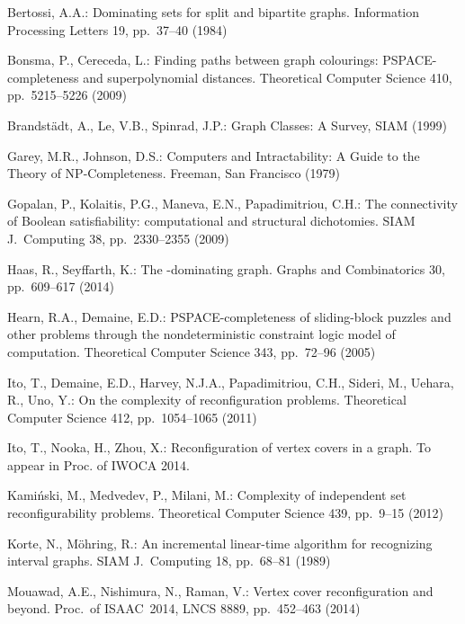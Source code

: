 \documentclass{llncs}
\begin{document}

\begin{thebibliography}{99}

Bertossi, A.A.:
Dominating sets for split and bipartite graphs.
Information Processing Letters 19, pp.~37--40 (1984)



Bonsma, P., Cereceda, L.:
Finding paths between graph colourings: PSPACE-completeness and superpolynomial distances.
Theoretical Computer Science
410, pp.~5215--5226 (2009)


Brandst\"adt, A., Le, V.B., Spinrad, J.P.:
Graph Classes: A Survey, SIAM (1999)




Garey, M.R., Johnson, D.S.:
Computers and Intractability: A Guide to the Theory of {NP}-Completeness.
Freeman, San Francisco (1979)



Gopalan, P., Kolaitis, P.G., Maneva, E.N., Papadimitriou, C.H.:
The connectivity of Boolean satisfiability: computational and structural dichotomies.
SIAM J.~Computing 38, pp.~2330--2355 (2009)

Haas, R., Seyffarth, K.:
The -dominating graph.
Graphs and Combinatorics 30, pp.~609--617 (2014)

Hearn, R.A., Demaine, E.D.:
PSPACE-completeness of sliding-block puzzles and other problems through the nondeterministic constraint logic model of computation.
Theoretical Computer Science
343, pp.~72--96 (2005)


Ito, T., Demaine, E.D., Harvey, N.J.A., Papadimitriou, C.H., Sideri, M., Uehara, R., Uno, Y.:
On the complexity of reconfiguration problems.
Theoretical Computer Science
412, pp.~1054--1065 (2011)

Ito, T., Nooka, H., Zhou, X.:
Reconfiguration of vertex covers in a graph.
To appear in Proc. of IWOCA 2014.

Kami\'nski, M., Medvedev, P., Milani, M.:
Complexity of independent set reconfigurability problems.
Theoretical Computer Science 439, pp.~9--15 (2012)

Korte, N., M{\"{o}}hring, R.:
An incremental linear-time algorithm for recognizing interval graphs.
SIAM J.~Computing 18, pp.~68--81 (1989)



Mouawad, A.E., Nishimura, N., Raman, V.:
Vertex cover reconfiguration and beyond.
Proc.~of ISAAC~2014, LNCS 8889, pp.~452--463 (2014)


\end{thebibliography}
\end{document}
